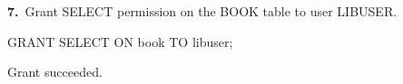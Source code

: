 \noindent\begin{minipage}{\linewidth}
\begingroup{}
{\fontsize{14}{17}\selectfont\textbf{7.}}\ Grant SELECT permission on the BOOK table to user LIBUSER.\par
\endgroup\vspace{12pt}


\begin{sqlcode}
GRANT SELECT ON book TO libuser;
\end{sqlcode}

\vspace{18pt}


\begin{sqlout}[fontsize=\small]
Grant succeeded.
\end{sqlout}
\end{minipage}\par\vspace{24pt}

